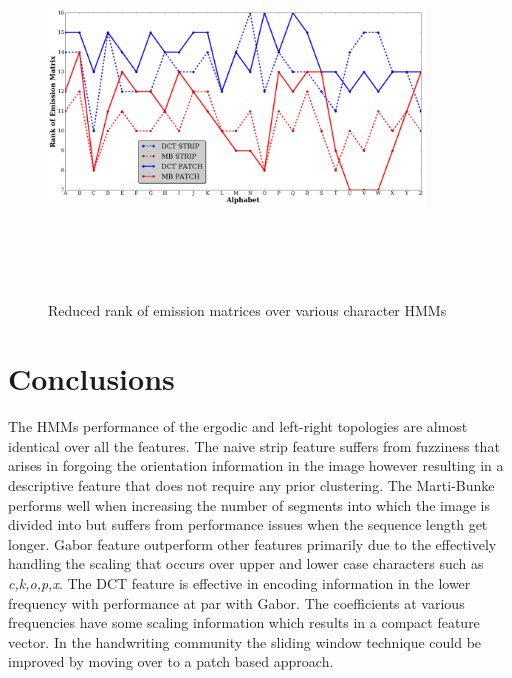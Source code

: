 \documentclass[runningheads]{llncs}
\begin{document}
\begin{figure}[!t]
\begin{minipage}[b]{1.0\linewidth}
  \centering
  \centerline{\includegraphics[width=10.0cm,height=10.0cm]{rank}}
\end{minipage}
\caption{Reduced rank of emission matrices over various character HMMs}
\label{fig:rank}
\end{figure}

\section{Conclusions}
\label{sec:conc}
The HMMs performance of the ergodic and left-right topologies are almost identical over all the features. The naive strip feature suffers from fuzziness that arises in forgoing the orientation information in the image however resulting in a descriptive feature that does not require any prior clustering. The Marti-Bunke performs well when increasing the number of segments into which the image is divided into but suffers from performance issues when the sequence length get longer. Gabor feature outperform other features primarily due to the effectively handling the scaling that occurs over upper and lower case characters such as \emph{c,k,o,p,x}. The DCT feature is effective in encoding information in the lower frequency with performance at par with Gabor. The coefficients at various frequencies have some scaling information which results in a compact feature vector. In the handwriting community the sliding window technique could be improved by moving over to a patch based approach.
\end{document}
